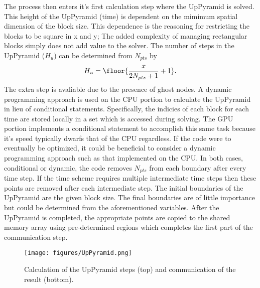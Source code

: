 \documentclass[review]{elsarticle}
\begin{document}
\par
The process then enters it's first calculation step where the UpPyramid is solved. This height of the UpPyramid (time) is dependent on the mimimum spatial dimension of the block size. This dependence is the reasoning for restricting the blocks to be square in x and y; The added complexity of managing rectangular blocks simply does not add value to the solver. The number of steps in the UpPyramid ($H_u$) can be determined from $N_{pts}$ by
\begin{equation}
  H_{u} = \floor{\frac{x}{2N_{pts}+1}+1}.
\end{equation}
The extra step is avaliable due to the presence of ghost nodes. A dynamic programming approach is used on the CPU portion to calculate the UpPyramid in lieu of conditional statements. Specifically, the indicies of each block for each time are stored locally in a set which is accessed during solving. The GPU portion implements a conditional statement to accomplish this same task because it's speed typically dwarfs that of the CPU regardless. If the code were to eventually be optimized, it could be beneficial to consider a dynamic programming approach such as that implemented on the CPU. In both cases, conditional or dynamic, the code removes $N_{pts}$ from each boundary after every time step. If the time scheme requires multiple intermediate time steps then these points are removed after each intermediate step. The initial boundaries of the UpPyramid are the given block size. The final boundaries are of little importance but could be determined from the aforementioned variables.
After the UpPyramid is completed, the appropriate points are copied to the shared memory array using pre-determined regions which completes the first part of the communication step.
\begin{figure}[h!]
    \centering
       \texttt{[image: figures/UpPyramid.png]}
    \label{fig:UP}
    \caption{Calculation of the UpPyramid steps (top) and communication of the result (bottom).}
\end{figure}
\end{document}
